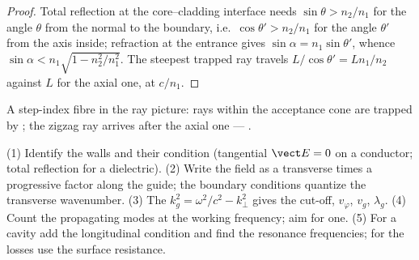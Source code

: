 \begin{proof}
Total reflection at the core--cladding interface needs $\sin\theta >
n_2/n_1$ for the angle $\theta$ from the normal to the boundary, i.e.\ $\cos
\theta' > n_2/n_1$ for the angle $\theta'$ from the axis inside; refraction
at the entrance gives $\sin\alpha = n_1\sin\theta'$, whence $\sin\alpha < n_1\sqrt{1
- n_2^2/n_1^2}$. The steepest trapped ray travels $L/\cos\theta' = Ln_1/n_2$
against $L$ for the axial one, at $c/n_1$.
\end{proof}

\begin{omfigure}

{\small A step-index fibre in the ray picture: rays within the
acceptance cone are trapped by ; the zigzag
ray arrives after the axial one --- .}
\end{omfigure}

\begin{method}\label{met:b2:guided-waves:method}
(1) Identify the walls and their condition (tangential $\vect E = 0$ on
a conductor; total reflection for a dielectric). (2) Write the field
as a transverse  times a progressive factor along the
guide; the boundary conditions quantize the transverse wavenumber.
(3) The  $k_g^2 = \omega^2/c^2 - k_\perp^2$ gives the
cut-off, $v_\varphi$, $v_g$, $\lambda_g$. (4) Count the propagating modes at the
working frequency; aim for one. (5) For a cavity add the longitudinal
condition and find the resonance frequencies; for the losses use the
surface resistance.
\end{method}

